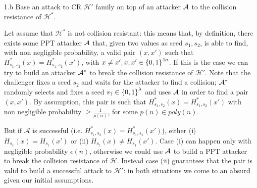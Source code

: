 \begin{enumerate}[(a)]
	      \begin{solution}
		      \begin{cryptoredux}
			      {1.b}
			      {Base an attack to CR $\mathcal{H}'$ family on top of an attacker $\mathcal{A}$ to the collision resistance of $\mathcal{H}^*$.}
			      {}
			      {}
			      {}
			      \cseqdelay
			      \cseqdelay
		      \end{cryptoredux}
		      Let assume that $\mathcal{H}^*$ is not collision resistant: this means that, by definition, there exists some PPT attacker $\mathcal{A}$ that, given two values as seed $s_1, s_2$, is able to find, with non negligible probability, a valid pair $(x, x')$ such that $H_{s_1, s_2}^*(x) = H_{s_1, s_2}^*(x')$, with $x \ne x', x, x' \in {\{0, 1\}}^{4n}$. If this is the case we can try to build an attacker $\mathcal{A}^*$ to break the collision resistance of $\mathcal{H}'$. Note that the challenger fixes a seed $s_2$ and waits for the attacker to find a collision; $\mathcal{A}^*$ randomly selects and fixes a seed $s_1 \in {\{0, 1\}}^\lambda$ and uses $\mathcal{A}$ in order to find a pair $(x, x')$. By assumption, this pair is such that $H^*_{s_1, s_2}(x) = H^*_{s_1, s_2}(x')$ with non negligible probability $\ge \frac{1}{p(n)}$, for some $p(n) \in poly(n)$.

		      But if $\mathcal{A}$ is successful (i.e. $H^*_{s_1, s_2}(x) = H^*_{s_1, s_2}(x')$), either (i) $H_{s_1}(x) = H_{s_1}(x')$ or (ii) $H_{s_1}(x) \ne H_{s_1}(x')$. Case (i) can happen only with negligible probability $\epsilon(n)$, otherwise we could use $\mathcal{A}$ to build a PPT attacker to break the collision resistance of $\mathcal{H}$. Instead case (ii) guarantees that the pair is valid to build a successful attack to $\mathcal{H}'$: in both situations we come to an absurd given our initial assumptions.
	      \end{solution}
\end{enumerate}